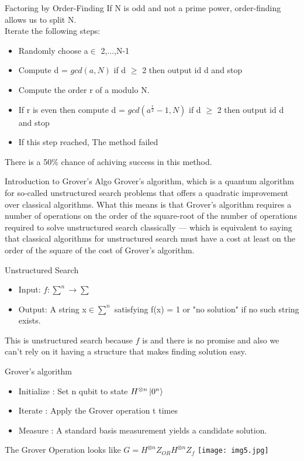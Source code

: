 \documentclass[12pt]{beamer}
\begin{document}
\begin{frame}{Factoring by Order-Finding}
If N is odd and not a prime power, order-finding allows us to split N.\\
Iterate the following steps:
\begin{itemize}	
\item Randomly choose a$\in$ {2,...,N-1}
\item Compute d = $gcd(a,N)$ if d $\geq$ 2 then output id d and stop 
\item Compute the order r of a modulo N.
\item If r is even then compute d = $gcd(a^{\frac{r}{2}}-1,N)$ if d $\geq$ 2 then output id d and stop 
\item If this step reached, The method failed
\end{itemize}
There is a 50$\%$ chance of achiving success in this method.
\end{frame}
\begin{frame}{Introduction to Grover's Algo}
Grover's algorithm, which is a quantum algorithm for so-called unstructured search problems that offers a quadratic improvement over classical algorithms. What this means is that Grover's algorithm requires a number of operations on the order of the square-root of the number of operations required to solve unstructured search classically — which is equivalent to saying that classical algorithms for unstructured search must have a cost at least on the order of the square of the cost of Grover's algorithm. 
\end{frame}
\begin{frame}{Unstructured Search}
\begin{itemize}
\item{Input: } $f : \sum^{n} \to \sum$ 
\item{Output: } A string x$\in \sum^{n}$ satisfying f(x) = 1 or "no solution" if no such string exists.
\end{itemize}
This is unstructured search because $f$ is  and there is no promise and also we can't rely on it having a structure that makes finding solution easy. 
\end{frame}
\begin{frame}{Grover's algorithm}
\begin{itemize}
\item Initialize : Set n qubit to state $H^{\otimes n}\ket{0^n}$
\item Iterate : Apply the Grover operation t times 
\item Measure : A standard basis measurement yields a candidate solution.
\end{itemize}
The Grover Operation looks like \hspace{1cm} $G =H^{\otimes n} Z_{OR} H^{\otimes n} Z_f $ 
\texttt{[image: img5.jpg]} 
\end{frame}
\end{document}
